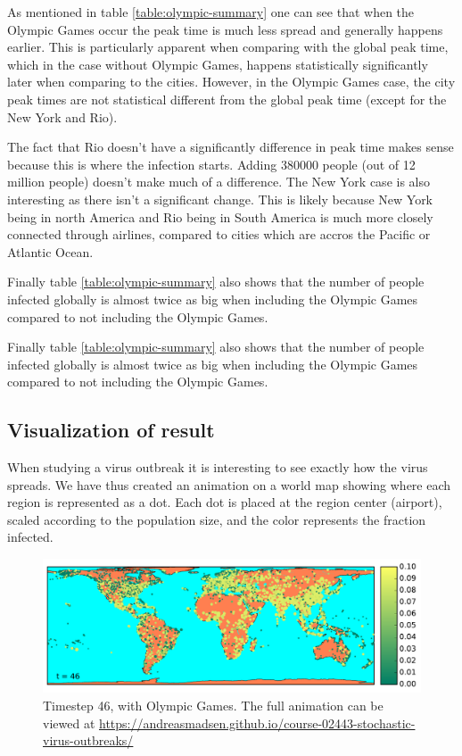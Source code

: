 As mentioned in table \ref{table:olympic-summary} one can see that when the Olympic Games occur the peak time is much less spread and generally happens earlier. This is particularly apparent when comparing with the global peak time, which in the case without Olympic Games, happens statistically significantly later when comparing to the cities. However, in the Olympic Games case, the city peak times are not statistical different from the global peak time (except for the New York and Rio).

The fact that Rio doesn't have a significantly difference in peak time makes sense because this is where the infection starts. Adding 380000 people (out of 12 million people) doesn't make much of a difference. The New York case is also interesting as there isn't a significant change. This is likely because New York being in north America and Rio being in South America is much more closely connected through airlines, compared to cities which are accros the Pacific or Atlantic Ocean.


Finally table \ref{table:olympic-summary} also shows that the number of people infected globally is almost twice as big when including the Olympic Games compared to not including the Olympic Games.

Finally table \ref{table:olympic-summary} also shows that the number of people infected globally is almost twice as big when including the Olympic Games compared to not including the Olympic Games.

\subsection{Visualization of result}
When studying a virus outbreak it is interesting to see exactly how the virus spreads. We have thus created an animation on a world map showing where each region is represented as a dot. Each dot is placed at the region center (airport), scaled according to the population size, and the color represents the fraction infected.

\begin{figure}[H]
	\centering
	\includegraphics[width=1.0 \linewidth]{plots/gifs/frames/rio-46}
	\caption{Timestep 46, with Olympic Games. The full animation can be viewed at
		\url{https://andreasmadsen.github.io/course-02443-stochastic-virus-outbreaks/}}
	\label{fig:rio-46}
\end{figure}

